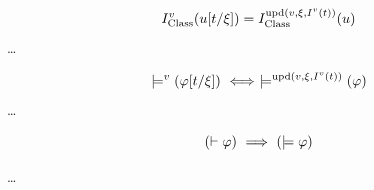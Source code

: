 \begin{lemma}
\[
I_{\text{Class}}^v(u[t/\xi])=I_{\text{Class}}^{\mathrm{upd}(v,\xi,I^v(t))}(u)
\]
\Proof
\dots
\Done
\end{lemma}
\begin{lemma}
\[
\models^v(\varphi[t/\xi])
\ \Longleftrightarrow\ 
\models^{\mathrm{upd}(v,\xi,I^v(t))}(\varphi)
\]%
\Proof
\dots
\Done
\end{lemma}

\begin{theorem}[soundness]
\[
(\vdash \varphi)
\ \Longrightarrow\ 
(\models \varphi)
\]
\end{theorem}
\Proof
\dots
\Done
\fi %

